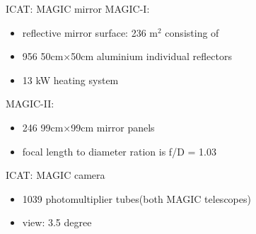 \documentclass{beamer}
\begin{document}
\begin{frame}{ICAT: MAGIC mirror}
    MAGIC-I:
	\begin{itemize}
        \item reflective mirror surface: 236 $\text{m}^2$ consisting of
        \item 956 50cm×50cm aluminium individual reflectors
        \item 13 kW heating system
    \end{itemize}
    \hfill \break
    MAGIC-II:
    \begin{itemize}
        \item 246 99cm×99cm mirror panels
        \item focal length to diameter ration is f/D = 1.03
    \end{itemize}

    \begin{figure}
        \centering
        \qquad
    \end{figure}
\end{frame}


\begin{frame}{ICAT: MAGIC camera}
    \begin{itemize}
        \item 1039 photomultiplier tubes(both MAGIC telescopes)
        \item view: 3.5 degree
    \end{itemize}

    \begin{figure}
        \centering
        \qquad
    \end{figure}
\end{frame}
\end{document}
